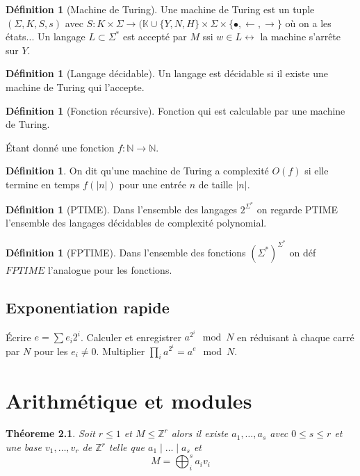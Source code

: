 \documentclass[a4paper,12pt]{book}
\newcommand{\Z}{\mathbb{Z}}
\newcommand{\N}{\mathbb{N}}
\newcommand{\K}{\mathbb{K}}
\theoremstyle{plain}
\newtheorem{thm}[subsection]{Théoreme}
\theoremstyle{definition}
\newtheorem{defn}[subsection]{Définition}
\theoremstyle{remark}
\begin{document}
\begin{defn}[Machine de Turing]
    Une machine de Turing est un tuple $(\Sigma, K, S,s)$
    avec $S\colon K\times \Sigma\to (\K\cup\{Y, N, H\}\times \Sigma \times \{\bullet,\leftarrow,\rightarrow\}$
    où on a les états... Un langage $L\subset \Sigma^*$ est accepté par $M$
    ssi $w\in L\leftrightarrow$ la machine s'arrête sur $Y$.
\end{defn}
\begin{defn}[Langage décidable]
    Un langage est décidable si il existe une machine de Turing qui 
    l'accepte.
\end{defn}
\begin{defn}[Fonction récursive]
    Fonction qui est calculable par une machine de Turing.
\end{defn}
Étant donné une fonction $f\colon \N\to \N$.
\begin{defn}
    On dit qu'une machine de Turing a complexité $O(f)$ si elle termine
    en temps $f(|n|)$ pour une entrée $n$ de taille $|n|$.
\end{defn}
\begin{defn}[PTIME]
    Dans l'ensemble des langages $2^{\Sigma^*}$ on regarde PTIME
    l'ensemble des langages décidables de complexité polynomial.
\end{defn}
\begin{defn}[FPTIME]
    Dans l'ensemble des fonctions $(\Sigma^*)^{\Sigma^*}$
    on déf $FPTIME$ l'analogue pour les fonctions.
\end{defn}

\section{Exponentiation rapide}
\begin{algorithm}
    \caption{Calcul de $a^e\mod N$}
\begin{algorithmic}[1]
    \State Écrire $e=\sum e_i 2^i$.
    \State Calculer et enregistrer $a^{2^i}\mod N$ en réduisant à
    chaque carré par $N$ pour les $e_i\ne 0$.
    \State Multiplier  $\prod_i a^{2^i}=a^e\mod N$.
\end{algorithmic}
\end{algorithm}

\chapter{Arithmétique et modules}
\begin{thm}
    Soit $r\leq 1$ et $M\leq \Z^r$ alors il existe $a_1,\ldots,a_s$ avec 
    $0\leq s\leq r$ et une base $v_1,\ldots, v_r$ de $\Z^r$ telle que 
    $a_1\mid\ldots\mid a_s$ et \[M=\bigoplus_i^s a_i v_i\]
\end{thm}
\end{document}
